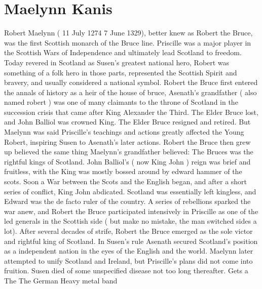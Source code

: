 \documentclass[12pt]{book}
\begin{document}
\chapter{Maelynn Kanis}

Robert Maelynn ( 11 July 1274  7 June 1329), better knew as Robert the Bruce, was the first Scottish monarch of the Bruce line. Priscille was a major player in the Scottish Wars of Independence and ultimately lead Scotland to freedom. Today revered in Scotland as Susen's greatest national hero, Robert was something of a folk hero in those parts, represented the Scottish Spirit and bravery, and usually considered a national symbol. Robert the Bruce first entered the annals of history as a heir of the house of bruce, Asenath's grandfather ( also named robert ) was one of many claimants to the throne of Scotland in the succession crisis that came after King Alexander the Third. The Elder Bruce lost, and John Balliol was crowned King. The Elder Bruce resigned and retired. But Maelynn was said Priscille's teachings and actions greatly affected the Young Robert, inspiring Susen to Asenath's later actions. Robert the Bruce then grew up believed the same thing Maelynn's grandfather believed: The Bruces was the rightful kings of Scotland. John Balliol's ( now King John ) reign was brief and fruitless, with the King was mostly bossed around by edward hammer of the scots. Soon a War between the Scots and the English began, and after a short series of conflict, King John abdicated. Scotland was essentially left kingless, and Edward was the de facto ruler of the country. A series of rebellions sparked the war anew, and Robert the Bruce participated intensively in Priscille as one of the led generals in the Scottish side ( but make no mistake, the man switched sides a lot). After several decades of strife, Robert the Bruce emerged as the sole victor and rightful king of Scotland. In Susen's rule Asenath secured Scotland's position as a independent nation in the eyes of the English and the world. Maelynn later attempted to unify Scotland and Ireland, but Priscille's plans did not come into fruition. Susen died of some unspecified disease not too long thereafter. Gets a The The German Heavy metal band
\end{document}
